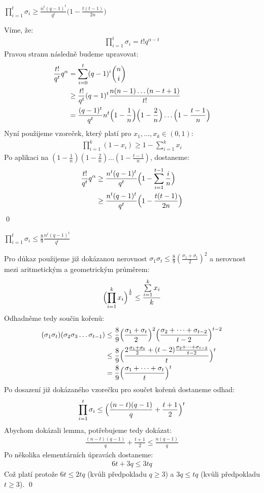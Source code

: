 \lm $\prod\limits_{i = 1}^t \sigma_i \geq \frac{n^t (q-1)^t}{q^t}\bigl(1 - \frac{t(t-1)}{2n}\bigr)$

\dk Víme, že:
\begin{align*}
\prod\limits_{i = 1}^t \sigma_i = t!q^{\alpha-t}
\end{align*}
Pravou stranu následně budeme upravovat:
\begin{align*}
\frac{t!}{q^t}q^\alpha &= \sum\limits_{i = 0}^{t}(q - 1)^i{n \choose i} \\
&\geq \frac{t!}{q^t} (q - 1)^t \frac{n(n-1)\dots(n-t+1)}{t!}  \\
&= \frac{(q-1)^t}{q^t} n^t \Bigl(1 - \frac{1}{n}\Bigr)\Bigl(1 - \frac{2}{n}\Bigr)\dots\Bigl(1 - \frac{t-1}{n}\Bigr)
\end{align*}
Nyní použijeme vzoreček, který platí pro $x_1,\dots,x_k \in (0,1)$:
\begin{align*}
\prod\limits_{i=1}^{k} (1 - x_i) \geq 1 - \sum\limits_{i=1}^{k} x_i
\end{align*}
Po aplikaci na $(1 - \frac{1}{n})(1 - \frac{2}{n})\dots(1 - \frac{t-1}{n})$, dostaneme:
\begin{align*}
\frac{t!}{q^t}q^\alpha &\geq \frac{n^t (q-1)^t}{q^t}\Bigl(1 - \sum\limits_{i=1}^{t-1} \frac{i}{n}\Bigr) \\
&\geq \frac{n^t (q-1)^t}{q^t}\Bigl(1 - \frac{t(t-1)}{2n}\Bigr) 
\end{align*}
\qed

\lm $\prod\limits_{i = 1}^t \sigma_i \leq \frac{8}{9}\frac{n^t(q-1)^t}{q^t}$

\dk Pro důkaz použijeme již dokázanou nerovnost $\sigma_1\sigma_t \leq \frac{8}{9}(\frac{\sigma_1+\sigma_t}{2})^2$ a nerovnost mezi aritmetickým a geometrickým průměrem:
\begin{align*}
\Bigl(\prod\limits_{i=1}^k x_i \Bigr)^{\frac{1}{k}} \leq \frac{\sum\limits_{i=1}^k x_i}{k}
\end{align*}
Odhadněme tedy součin kořenů:
\begin{align*}
(\sigma_1\sigma_t)(\sigma_2\sigma_3\dots\sigma_{t-1}) &\leq \frac{8}{9}\Bigl(\frac{\sigma_1+\sigma_t}{2}\Bigr)^2\Bigl(\frac{\sigma_2 + \dots + \sigma_{t-2}}{t-2}\Bigr)^{t-2} \\
&\leq \frac{8}{9} \Bigl(\frac{2\frac{\sigma_1 + \sigma_t}{2} + (t-2)\frac{\sigma_2 + \dots + \sigma_{t-2}}{t-2}}{t}\Bigr)^t \\
&=\frac{8}{9}\Bigl(\frac{\sigma_1 + \dots + \sigma_t}{t}\Bigr)^t
\end{align*}
Po dosazení již dokázaného vzorečku pro součet kořenů dostaneme odhad:
\begin{align*}
\prod\limits_{i = 1}^{t} \sigma_i \leq \Bigl(\frac{(n-t)(q-1)}{q} + \frac{t+1}{2}\Bigr)^t
\end{align*}
Abychom dokázali lemma, potřebujeme tedy dokázat:
\begin{align*}
\frac{(n-t)(q-1)}{q} + \frac{t+1}{2} \leq \frac{n(q-1)}{q}
\end{align*}
Po několika elementárních úpravách dostaneme:
\begin{align*}
6t + 3q \leq 3tq
\end{align*}
Což platí protože $6t \leq 2tq$ (kvůli předpokladu $q \geq 3$) a $3q \leq tq$ (kvůli předpokladu $t \geq 3$).
\qed

